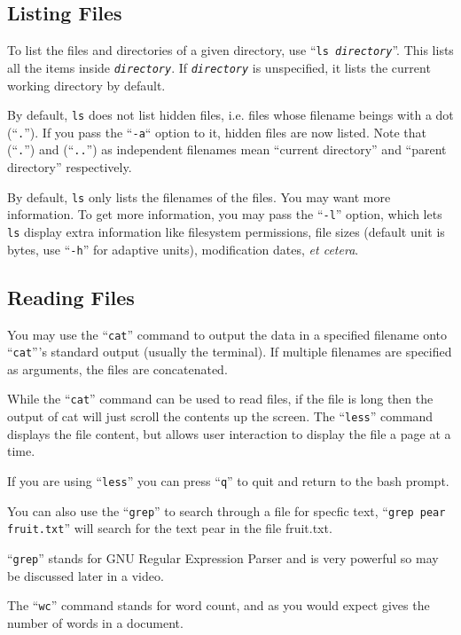 \documentclass{extbook}
\newcommand\ph[1]{\texttt{\textit{#1}}}
\begin{document}
\subsection{Listing Files}

To list the files and directories of a given directory, use ``\texttt{ls \ph{directory}}''.  This lists all the items inside \ph{directory}.  If \ph{directory} is unspecified, it lists the current working directory by default.

By default, \verb|ls| does not list hidden files, i.e. files whose filename beings with a dot (``\verb|.|'').  If you pass the ``\verb|-a|`` option to it, hidden files are now listed.  Note that (``\verb|.|'') and (``\verb|..|'') as independent filenames mean ``current directory'' and ``parent directory'' respectively.

By default, \verb|ls| only lists the filenames of the files.  You may want more information.  To get more information, you may pass the ``\verb|-l|'' option, which lets \verb|ls| display extra information like filesystem permissions, file sizes (default unit is bytes, use ``\verb|-h|'' for adaptive units), modification dates, \textit{et cetera}.

\subsection{Reading Files}

You may use the ``\verb|cat|'' command to output the data in a specified filename onto ``\verb|cat|'''s standard output (usually the terminal).  If multiple filenames are specified as arguments, the files are concatenated.

While the ``\verb|cat|'' command can be used to read files, if the file is long then the output of cat will just scroll the contents up the screen.  The ``\verb|less|'' command displays the file content, but allows user interaction to display the file a page at a time.

If you are using ``\verb|less|'' you can press ``\verb|q|'' to quit and return to the bash prompt.

You can also use the ``\verb|grep|'' to search through a file for specfic text, 
``\verb|grep pear fruit.txt|'' will search for the text pear in the file fruit.txt.   

``\verb|grep|'' stands for GNU Regular Expression Parser and is very powerful so may be discussed later in a video. 

The ``\verb|wc|'' command stands for word count, and as you would expect gives the number of words in a document.
\end{document}
